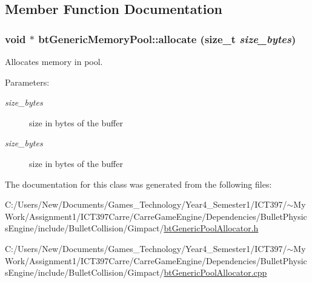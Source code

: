 \subsection{Member Function Documentation}
\hypertarget{classbt_generic_memory_pool_cd47d75d6fbd7dbf6f0d7849e0bd9ec1}{
\subsubsection[allocate]{\setlength{\rightskip}{0pt plus 5cm}void $\ast$ btGenericMemoryPool::allocate (size\_\-t {\em size\_\-bytes})}}
\label{classbt_generic_memory_pool_cd47d75d6fbd7dbf6f0d7849e0bd9ec1}


Allocates memory in pool. 

\begin{Desc}
\item[Parameters:]
\begin{description}
\item[{\em size\_\-bytes}]size in bytes of the buffer\item[{\em size\_\-bytes}]size in bytes of the buffer \end{description}
\end{Desc}


The documentation for this class was generated from the following files:\begin{CompactItemize}
\item 
C:/Users/New/Documents/Games\_\-Technology/Year4\_\-Semester1/ICT397/$\sim$My Work/Assignment1/ICT397Carre/CarreGameEngine/Dependencies/BulletPhysicsEngine/include/BulletCollision/Gimpact/\hyperlink{bt_generic_pool_allocator_8h}{btGenericPoolAllocator.h}\item 
C:/Users/New/Documents/Games\_\-Technology/Year4\_\-Semester1/ICT397/$\sim$My Work/Assignment1/ICT397Carre/CarreGameEngine/Dependencies/BulletPhysicsEngine/include/BulletCollision/Gimpact/\hyperlink{bt_generic_pool_allocator_8cpp}{btGenericPoolAllocator.cpp}\end{CompactItemize}
